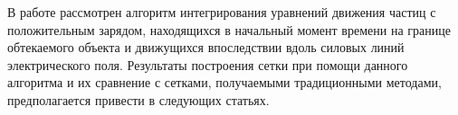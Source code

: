 \documentclass[a4paper,12pt]{article}
\begin{document}
В работе рассмотрен алгоритм интегрирования уравнений движения частиц с положительным зарядом, находящихся в начальный момент времени на границе обтекаемого объекта и движущихся впоследствии вдоль силовых линий электрического поля. Результаты построения сетки при помощи данного алгоритма и их сравнение с сетками, получаемыми традиционными методами, предполагается привести в следующих статьях.

\nocite{кудрявцев2010краткий}
\nocite{ландау2001теоретическая}

\printbibliography
\end{document}
